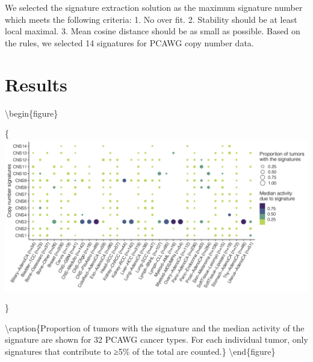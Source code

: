 \documentclass[
]{article}
\begin{document}
We selected the signature extraction solution as the maximum signature
number which meets the following criteria: 1. No over fit. 2. Stability
should be at least local maximal. 3. Mean cosine distance should be as
small as possible. Based on the rules, we selected 14 signatures for
PCAWG copy number data.

\hypertarget{results}{%
\section{Results}\label{results}}

\textbackslash begin\{figure\}

\{\centering \includegraphics[width=0.7\linewidth]{Figures/CNS_PCAWG_landscape_proportion_0.05}

\}

\textbackslash caption\{Proportion of tumors with the signature and the
median activity of the signature are shown for 32 PCAWG cancer types.
For each individual tumor, only signatures that contribute to ≥5\% of
the total are counted.\}\label{fig:figure3} \textbackslash end\{figure\}
\end{document}

